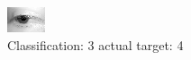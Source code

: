 \begin{figure}[h!]
\begin{center}
\includegraphics[width=0.60\columnwidth]{figures/ID2558_class_3_target_4.png}
\end{center}
\caption{ Classification: 3 actual target: 4}
\label{fig:ID2558_class_3_target_4}
\end{figure}
